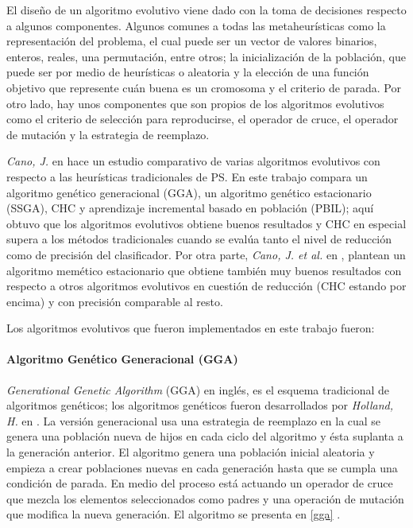 El diseño de un algoritmo evolutivo viene dado con la toma de decisiones respecto a algunos componentes. Algunos comunes a todas las metaheurísticas como la representación del problema, el cual puede ser un vector de valores binarios, enteros, reales, una permutación, entre otros; la inicialización de la población, que puede ser por medio de heurísticas o aleatoria y la elección de una función objetivo que represente cuán buena es un cromosoma y el criterio de parada. Por otro lado, hay unos componentes que son propios de los algoritmos evolutivos como el criterio de selección para reproducirse, el operador de cruce, el operador de mutación y la estrategia de reemplazo.

\emph{Cano, J.} en \cite{de2004reduccion} hace un estudio comparativo de varias algoritmos evolutivos con respecto a las heurísticas tradicionales de PS. En este trabajo compara un algoritmo genético generacional (GGA), un algoritmo genético estacionario (SSGA), CHC y aprendizaje incremental basado en población (PBIL); aquí obtuvo que los algoritmos evolutivos obtiene buenos resultados y CHC en especial supera a los métodos tradicionales cuando se evalúa tanto el nivel de reducción como de precisión del clasificador. Por otra parte, \emph{Cano, J. et al.} en \cite{garcia2008memetic}, plantean un algoritmo memético estacionario que obtiene también muy buenos resultados con respecto a otros algoritmos evolutivos en cuestión de reducción (CHC estando por encima) y con precisión comparable al resto. 

Los algoritmos evolutivos que fueron implementados en este trabajo fueron:

\paragraph{Algoritmo Genético Generacional (GGA)}

 \emph{Generational Genetic Algorithm} (GGA) en inglés, es el esquema tradicional de algoritmos genéticos; los algoritmos genéticos fueron desarrollados por \emph{Holland, H.} en \cite{holland1975adaptation}. La versión generacional usa una estrategia de reemplazo en la cual se genera una población nueva de hijos en cada ciclo del algoritmo y ésta suplanta a la generación anterior. El algoritmo genera una población inicial aleatoria y empieza a crear poblaciones nuevas en cada generación hasta que se cumpla una condición de parada. En medio del proceso está actuando un operador de cruce que mezcla los elementos seleccionados como padres y una operación de mutación que modifica la nueva generación. El algoritmo se presenta en \ref{gga} \cite{flores2014metaheuristics}.

